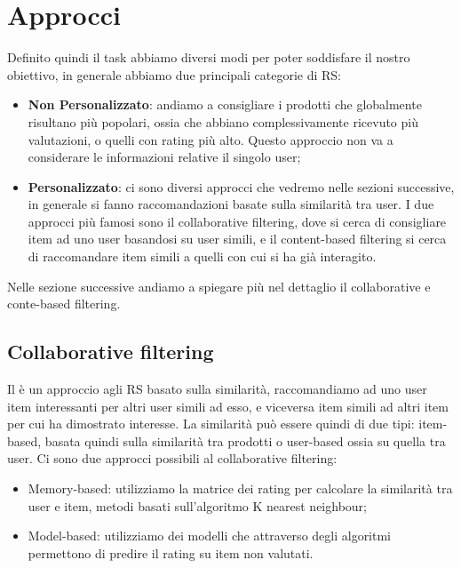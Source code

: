 \section{Approcci}
Definito quindi il task abbiamo diversi modi per poter soddisfare il nostro obiettivo, in generale abbiamo due principali categorie di RS:
\begin{itemize}
	\item \textbf{Non Personalizzato}: andiamo a consigliare i prodotti che globalmente risultano più popolari, ossia che abbiano complessivamente ricevuto più valutazioni, o quelli con rating più alto. Questo approccio non va a considerare le informazioni relative il singolo user;
	\item \textbf{Personalizzato}: ci sono diversi approcci che vedremo nelle sezioni successive, in generale si fanno raccomandazioni basate sulla similarità tra user. I due approcci più famosi sono il collaborative filtering, dove si cerca di consigliare item ad uno user basandosi su user simili, e il content-based filtering si cerca di raccomandare item simili a quelli con cui si ha già interagito.
\end{itemize}

Nelle sezione successive andiamo a spiegare più nel dettaglio il collaborative e conte-based filtering.

\subsection{Collaborative filtering}
Il  è un approccio agli RS basato sulla similarità, raccomandiamo ad uno user item interessanti per altri user simili ad esso, e viceversa item simili ad altri item per cui ha dimostrato interesse.
La similarità può essere quindi di due tipi: item-based, basata quindi sulla similarità tra prodotti o user-based ossia su quella tra user.
Ci sono due approcci possibili al collaborative filtering:
\begin{itemize}
	\item Memory-based: utilizziamo la matrice dei rating per calcolare la similarità tra user e item, metodi basati sull'algoritmo K nearest neighbour;
	\item Model-based: utilizziamo dei modelli che attraverso degli algoritmi permettono di predire il rating su item non valutati.
\end{itemize}


